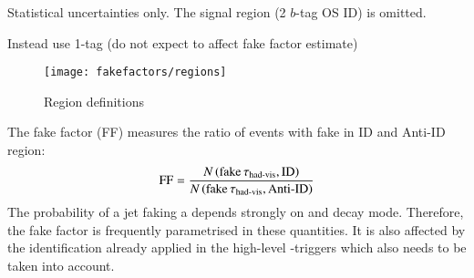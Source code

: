 \begin{table}[htbp]
  \centering

  \begin{subtable}[t]{\textwidth}
    \centering
    
  \end{subtable}

  \begin{subtable}[t]{\textwidth}
    \centering
    
  \end{subtable}

  \caption{Statistical uncertainties only. The signal region (2
    $b$-tag OS ID) is omitted.}
  \label{tab:mjfakes_yields}
\end{table}

Instead use 1-tag (do not expect \btag to affect fake factor estimate)







\begin{figure}[htbp]
  \centering

  \texttt{[image: fakefactors/regions]}

  \caption{Region definitions}
  \label{fig:fakefactor_regions}
\end{figure}


The fake factor (FF) measures the ratio of events with fake \tauhadvis in ID and
Anti-ID region:
\begin{align*}
  \text{FF} = \frac{N\left( \text{fake} \, \tau_{\text{had-vis}}, \text{ID} \right)}{N\left( \text{fake} \, \tau_{\text{had-vis}}, \text{Anti-ID} \right)}
\end{align*}
The probability of a jet faking a \tauhadvis depends strongly on \tauhadvis \pT
and decay mode. Therefore, the fake factor is frequently parametrised in these
quantities. It is also affected by the \tauhadvis identification already applied
in the high-level \tauhadvis-triggers which also needs to be taken into account.

